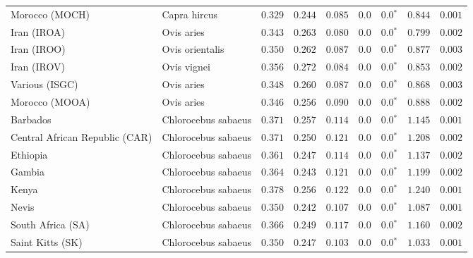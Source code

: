 \begin{center}
\begin{adjustbox}{width = 1\textwidth}
\begin{tabular}{|l|l|r|r|r|r|r|r|r|}
            Morocco (MOCH)                    & Capra hircus     & $ 0.329$ & $ 0.244$ & $ 0.085$ & $0.0$ & $\bm{0.0{^*}}$ & $ 0.844$ & $ 0.001$ \\
            Iran (IROA)                    & Ovis aries         & $ 0.343$ & $ 0.263$ & $ 0.080$ & $0.0$ & $\bm{0.0{^*}}$ & $ 0.799$ & $ 0.002$ \\
            Iran (IROO)                 & Ovis orientalis          & $ 0.350$ & $ 0.262$ & $ 0.087$ & $0.0$ & $\bm{0.0{^*}}$ & $ 0.877$ & $ 0.003$ \\
            Iran (IROV)                 & Ovis vignei          & $ 0.356$ & $ 0.272$ & $ 0.084$ & $0.0$ & $\bm{0.0{^*}}$ & $ 0.853$ & $ 0.002$ \\
            Various (ISGC)                       & Ovis aries & $ 0.348$ & $ 0.260$ & $ 0.087$ & $0.0$ & $\bm{0.0{^*}}$ & $ 0.868$ & $ 0.003$ \\
            Morocco (MOOA) & Ovis aries & $ 0.346$ & $ 0.256$ & $ 0.090$ & $0.0$ & $\bm{0.0{^*}}$ & $ 0.888$ & $ 0.002$ \\
            Barbados                       & Chlorocebus sabaeus & $ 0.371$ & $ 0.257$ & $ 0.114$ & $0.0$ & $\bm{0.0{^*}}$ & $ 1.145$ & $ 0.001$ \\
            Central African Republic (CAR)                         & Chlorocebus sabaeus & $ 0.371$ & $ 0.250$ & $ 0.121$ & $0.0$ & $\bm{0.0{^*}}$ & $ 1.208$ & $ 0.002$ \\
            Ethiopia                          & Chlorocebus sabaeus & $ 0.361$ & $ 0.247$ & $ 0.114$ & $0.0$ & $\bm{0.0{^*}}$ & $ 1.137$ & $ 0.002$ \\
            Gambia                          & Chlorocebus sabaeus & $ 0.364$ & $ 0.243$ & $ 0.121$ & $0.0$ & $\bm{0.0{^*}}$ & $ 1.199$ & $ 0.002$ \\
            Kenya              & Chlorocebus sabaeus & $ 0.378$ & $ 0.256$ & $ 0.122$ & $0.0$ & $\bm{0.0{^*}}$ & $ 1.240$ & $ 0.001$ \\
            Nevis               & Chlorocebus sabaeus & $ 0.350$ & $ 0.242$ & $ 0.107$ & $0.0$ & $\bm{0.0{^*}}$ & $ 1.087$ & $ 0.001$ \\
            South Africa (SA)                         & Chlorocebus sabaeus & $ 0.366$ & $ 0.249$ & $ 0.117$ & $0.0$ & $\bm{0.0{^*}}$ & $ 1.160$ & $ 0.002$ \\
            Saint Kitts (SK)                  & Chlorocebus sabaeus        & $ 0.350$ & $ 0.247$ & $ 0.103$ & $0.0$ & $\bm{0.0{^*}}$ & $ 1.033$ & $ 0.001$ \\

\end{tabular}
\end{adjustbox}
\end{center}
